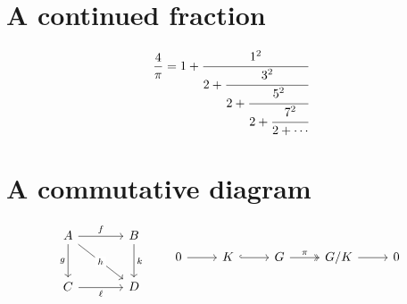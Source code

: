 \documentclass[11pt]{article}
\begin{document}
\section*{A continued fraction}
\begin{equation}
  \frac{4}{\pi} = 1 + \cfrac{1^2}{2 + \cfrac{3^2}{2 + \cfrac{5^2}{2 + \cfrac{7^2}{2 + \dotsb}}}}
\end{equation}

\section*{A commutative diagram}
\begin{equation*}
\begin{tikzcd}[column sep=large, row sep=large]
  A \arrow[r, "f"] \arrow[d, "g"'] \arrow[dr, "h" description] & B \arrow[d, "k"] \\
  C \arrow[r, "\ell"'] & D
\end{tikzcd}
\qquad
\begin{tikzcd}
  0 \arrow[r] & K \arrow[r, hook] & G \arrow[r, two heads, "\pi"] & G/K \arrow[r] & 0
\end{tikzcd}
\end{equation*}
\end{document}
